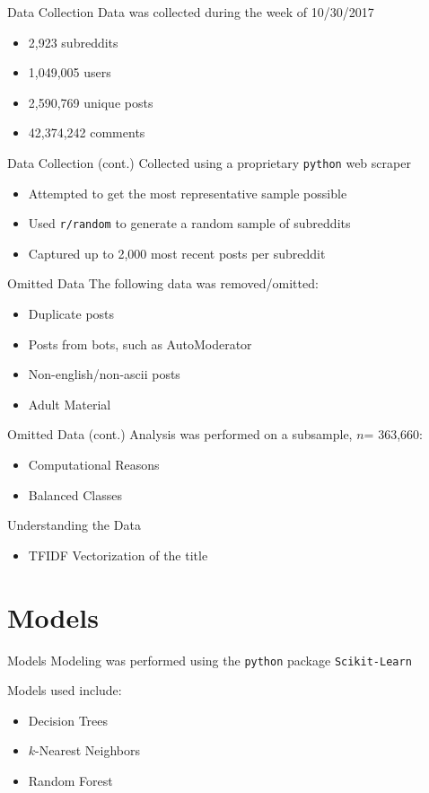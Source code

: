 \documentclass[10pt,t]{beamer}
\newcommand{\bi}{\begin{itemize}}                                 %
\newcommand{\ei}{\end{itemize}}                                   %
\begin{document}
\begin{frame}{Data Collection}
	Data was collected during the week of 10/30/2017
	\bi 
		\item 2,923 subreddits
		\item 1,049,005 users
		\item 2,590,769 unique posts
		\item 42,374,242 comments		
	\ei 
\end{frame}


\begin{frame}{Data Collection (cont.)}
	Collected using a proprietary \texttt{python} web scraper
	\bi
		\item Attempted to get the most representative sample possible
		\item Used \texttt{r/random} to generate a random sample of subreddits
		\item Captured up to 2,000 most recent posts per subreddit
	\ei	
\end{frame}


\begin{frame}{Omitted Data}
	The following data was removed/omitted:
	\bi				
		\item Duplicate posts
		\item Posts from bots, such as AutoModerator
		\item Non-english/non-ascii posts
		\item Adult Material
	\ei	
\end{frame}

\begin{frame}{Omitted Data (cont.)}
	Analysis was performed on a subsample, $n$= 363,660:
	\bi				
		\item Computational Reasons
		\item Balanced Classes
	\ei	
\end{frame}


\begin{frame}{Understanding the Data}
	\bi
		\item TFIDF Vectorization of the title
	\ei 
\end{frame}



\section{Models}

\begin{frame}{Models}
	Modeling was performed using the \texttt{python} package \texttt{Scikit-Learn}
	
	Models used include:
	\bi
		\item Decision Trees
		\item $k$-Nearest Neighbors
		\item Random Forest
	\ei
\end{frame}
\end{document}
